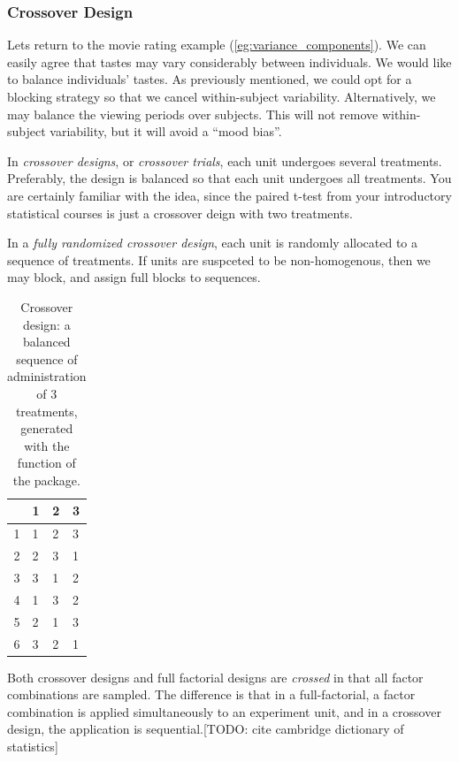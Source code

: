 \subsubsection{Crossover Design}
Lets return to the movie rating example (\ref{eg:variance_components}).
We can easily agree that tastes may vary considerably between individuals. 
We would like to balance individuals' tastes.
As previously mentioned, we could opt for a blocking strategy so that we cancel within-subject variability.
Alternatively, we may balance the viewing periods over subjects. 
This will not remove within-subject variability, but it will avoid a ``mood bias''.

In \emph{crossover designs}, or \emph{crossover trials}, each unit undergoes several treatments.
Preferably, the design is balanced so that each unit undergoes all treatments.
You are certainly familiar with the idea, since the paired t-test from your introductory statistical courses is just a crossover deign with two treatments.

In a \emph{fully randomized crossover design}, each unit is randomly allocated to a sequence of treatments.
If units are suspceted to be non-homogenous, then we may block, and assign full blocks to sequences.
\begin{table}[ht]
\centering
\begin{tabular}{rlll}
  \hline
 & 1 & 2 & 3 \\ 
  \hline
1 & 1 & 2 & 3 \\ 
  2 & 2 & 3 & 1 \\ 
  3 & 3 & 1 & 2 \\ 
  4 & 1 & 3 & 2 \\ 
  5 & 2 & 1 & 3 \\ 
  6 & 3 & 2 & 1 \\ 
   \hline
\end{tabular}
\label{tab:crossover}
\caption{Crossover design: a balanced sequence of administration of $3$ treatments, generated with the  function of the  \R package. }
\end{table}


\begin{remark}
Both crossover designs and full factorial designs are \emph{crossed} in that all factor combinations are sampled. 
The difference is that in a full-factorial, a factor combination is applied simultaneously to an experiment unit, and in a crossover design, the application is sequential.[TODO: cite cambridge dictionary of statistics]
\end{remark}



